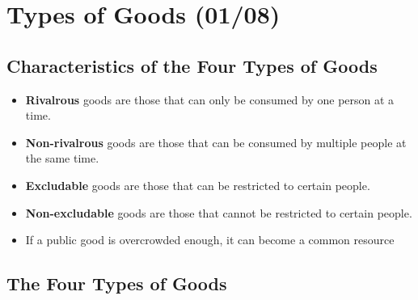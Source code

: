 \documentclass[
  letterpaper,
  DIV=11,
  numbers=noendperiod]{scrartcl}
\author{}
\date{}
\providecommand{\tightlist}{%
  \setlength{\itemsep}{0pt}\setlength{\parskip}{0pt}}\usepackage{longtable,booktabs,array}
\renewcommand*\contentsname{Table of contents}
\newcommand\contentsname{Table of contents}
\begin{document}

\newpage

\ifdefined\Shaded\renewenvironment{Shaded}{\begin{tcolorbox}[enhanced, sharp corners, frame hidden, interior hidden, breakable, borderline west={3pt}{0pt}{shadecolor}, boxrule=0pt]}{\end{tcolorbox}}\fi

\renewcommand*\contentsname{Table of Contents}
{
\hypersetup{linkcolor=}
\setcounter{tocdepth}{4}
\tableofcontents
}
\newpage{}

\hypertarget{types-of-goods-0108}{%
\section{Types of Goods (01/08)}\label{types-of-goods-0108}}

\hypertarget{characteristics-of-the-four-types-of-goods}{%
\subsection{Characteristics of the Four Types of
Goods}\label{characteristics-of-the-four-types-of-goods}}

\begin{itemize}
\tightlist
\item
  \textbf{Rivalrous} goods are those that can only be consumed by one
  person at a time.
\item
  \textbf{Non-rivalrous} goods are those that can be consumed by
  multiple people at the same time.
\item
  \textbf{Excludable} goods are those that can be restricted to certain
  people.
\item
  \textbf{Non-excludable} goods are those that cannot be restricted to
  certain people.
\item
  If a public good is overcrowded enough, it can become a common
  resource
\end{itemize}

\hypertarget{the-four-types-of-goods}{%
\subsection{The Four Types of Goods}\label{the-four-types-of-goods}}
\end{document}
